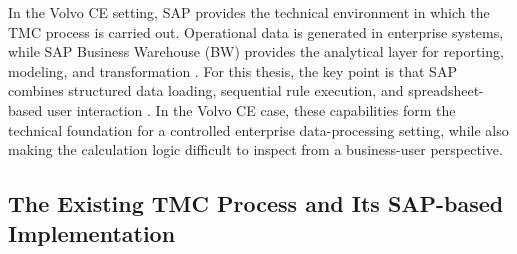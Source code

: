 In the Volvo CE setting, SAP provides the technical environment in which the TMC process is carried out. Operational data is generated in enterprise systems, while SAP Business Warehouse (BW) provides the analytical layer for reporting, modeling, and transformation \cite{sap_bw_guide}. For this thesis, the key point is that SAP combines structured data loading, sequential rule execution, and spreadsheet-based user interaction \cite{sap_bw_ip_overview}. In the Volvo CE case, these capabilities form the technical foundation for a controlled enterprise data-processing setting, while also making the calculation logic difficult to inspect from a business-user perspective.












\subsection{The Existing TMC Process and Its SAP-based Implementation}
\label{subsec:tmc_process_implementation}




